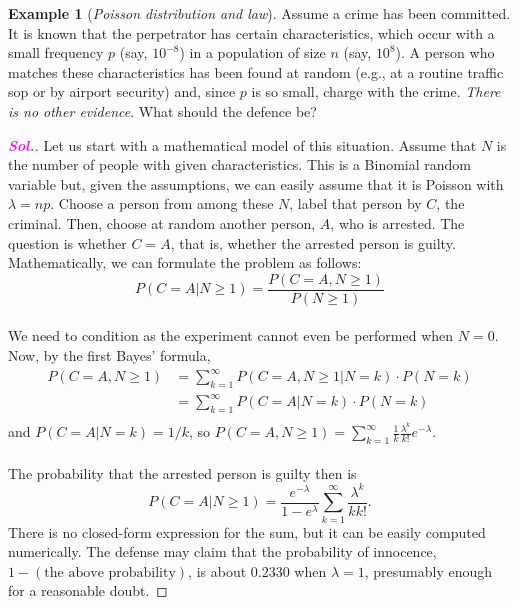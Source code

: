 \documentclass[12pt,a4paper]{article}
\theoremstyle{definition}
\newtheorem{example}{Example}[section]
\theoremstyle{definition}
\theoremstyle{definition}
\theoremstyle{definition}
\theoremstyle{remark}
\theoremstyle{definition}
\newcommand{\dispsty}{\displaystyle}
\newcommand{\sol}{\textcolor{magenta}{\bf \textit{Sol.}}\quad}
\begin{document}
\begin{example}[\it Poisson distribution and law]
	Assume a crime has been committed. It is known that the perpetrator has certain characteristics, which occur with a small frequency $p$ (say, $10^{-8}$) in a population of size $n$ (say, $10^8$). A person who matches these characteristics has been found at random (e.g., at a routine traffic sop or by airport security) and, since $p$ is so small, charge with the crime. \textit{There is no other evidence}. What should the defence be?\begin{proof}[\sol]
		Let us start with a mathematical model of this situation. Assume that $N$ is the number of people with given characteristics. This is a Binomial random variable but, given the assumptions, we can easily assume that it is Poisson with $\lambda=np$. Choose a person from among these $N$, label that person by $C$, the criminal. Then, choose at random another person, $A$, who is arrested. The question is whether $C=A$, that is, whether the arrested person is guilty. Mathematically, we can formulate the problem as follows: \[
		P(C=A|N\geq 1)=\frac{P(C=A,N\geq1)}{P(N\geq 1)}
		\]\newpage
		\ \\We need to condition as the experiment cannot even be performed when $N=0$. Now, by the first Bayes' formula, \begin{align*}
		P(C=A,N\geq1)&=\sum_{k=1}^\infty P(C=A,N\geq1|N=k)\cdot P(N=k)\\
		&=\sum_{k=1}^\infty P(C=A|N=k)\cdot P(N=k)\\
		\end{align*} and $P(C=A|N=k)=1/k$, so $\dispsty P(C=A,N\geq 1)=\sum_{k=1}^\infty\frac{1}{k}\frac{\lambda^k}{k!}e^{-\lambda}$.\\
		\\
		The probability that the arrested person is guilty then is \[
		P(C=A|N\geq 1)=\frac{e^{-\lambda}}{1-e^{\lambda}}\sum_{k=1}^{\infty}\frac{\lambda^k}{kk!}.
		\] There is no closed-form expression for the sum, but it can be easily computed numerically. The defense may claim that the probability of innocence, $1-(\text{the above probability})$, is about $0.2330$ when $\lambda=1$, presumably enough for a reasonable doubt.
	\end{proof}
\end{example}

\newpage
\end{document}
